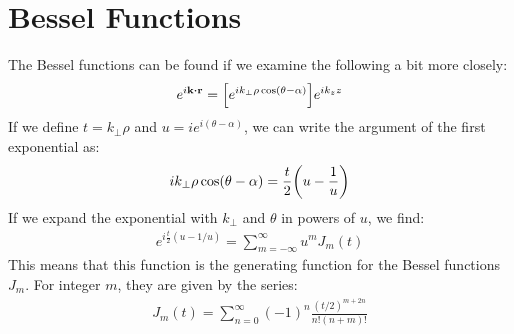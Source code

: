 \documentclass[12pt]{article}
\theoremstyle{plain}
\theoremstyle{definition}
\begin{document}
\section{Bessel Functions}
The Bessel functions can be found if we examine the following a bit more closely:
\begin{align*}
  e^{i\vb{k}\vdot\vb{r}}=\qty[e^{ik_\perp\rho\cos(\theta-\alpha)}]e^{ik_zz}
\end{align*}
If we define $t=k_\perp\rho$ and $u=ie^{i(\theta-\alpha)}$, we can write the argument of the first exponential as:
\begin{align*}
  ik_\perp\rho\cos(\theta-\alpha)=\frac{t}{2}\qty(u-\frac1u)
\end{align*}
If we expand the exponential with $k_\perp$ and $\theta$ in powers of $u$, we find:
\begin{align*}
  e^{i\frac{t}{2}(u-1/u)}=\sum_{m=-\infty}^\infty u^mJ_m(t)
\end{align*}
This means that this function is the generating function for the Bessel functions $J_m$. For integer $m$, they are given by the series:
\begin{align*}
  J_m(t)=\sum_{n=0}^\infty(-1)^n\frac{(t/2)^{m+2n}}{n!(n+m)!}
\end{align*}
\end{document}

